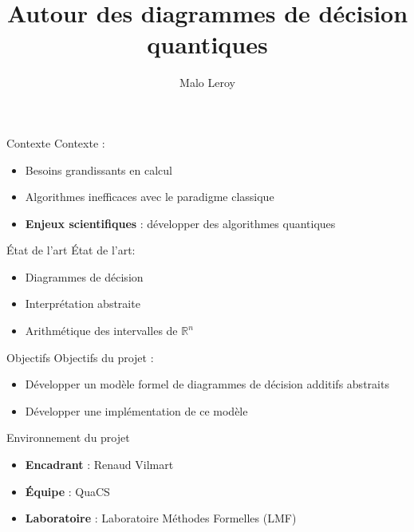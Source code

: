 \documentclass[french]{beamer}
\title{Autour des diagrammes de décision quantiques}
\author{Malo Leroy}
\institute{Parcours recherche -- CentraleSupélec}
\begin{document}
\begin{frame}
    \titlepage
\end{frame}

\begin{frame}{Contexte}
Contexte :
\begin{itemize}
    \item Besoins grandissants en calcul
    \item Algorithmes inefficaces avec le paradigme classique
    \pause
    \item \textbf{Enjeux scientifiques} : développer des algorithmes quantiques
\end{itemize}
\end{frame}

\begin{frame}{État de l'art}
État de l'art:
\begin{itemize}
    \item Diagrammes de décision
    \item Interprétation abstraite
    \item Arithmétique des intervalles de $\mathbb{R}^n$
\end{itemize}
\end{frame}

\begin{frame}{Objectifs}
Objectifs du projet :
\begin{itemize}
    \item Développer un modèle formel de diagrammes de décision additifs abstraits
    \item Développer une implémentation de ce modèle
\end{itemize}
    
\end{frame}

\begin{frame}{Environnement du projet}
\begin{itemize}
    \item \textbf{Encadrant} : Renaud Vilmart
    \item \textbf{Équipe} : QuaCS
    \item \textbf{Laboratoire} : Laboratoire Méthodes Formelles (LMF)
\end{itemize}
\end{frame}
\end{document}
